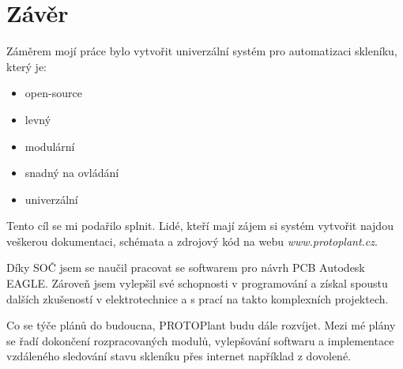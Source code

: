 \chapter*{Závěr}

Záměrem mojí práce bylo vytvořit univerzální systém pro automatizaci skleníku, který je:
\begin{itemize}
    \item open-source
    \item levný
    \item modulární
    \item snadný na ovládání
    \item univerzální
\end{itemize}

Tento cíl se mi podařilo splnit.
Lidé, kteří mají zájem si systém vytvořit najdou veškerou dokumentaci, schémata a zdrojový kód na webu \textit{www.protoplant.cz}.

Díky SOČ jsem se naučil pracovat se softwarem pro návrh PCB Autodesk EAGLE.
Zároveň jsem vylepšil své schopnosti v programování a získal spoustu dalších zkušeností v elektrotechnice a s prací na takto komplexních projektech.

Co se týče plánů do budoucna, PROTOPlant budu dále rozvíjet.
Mezi mé plány se řadí dokončení rozpracovaných modulů, vylepšování softwaru a implementace vzdáleného sledování stavu skleníku přes internet například z dovolené.

\newpage